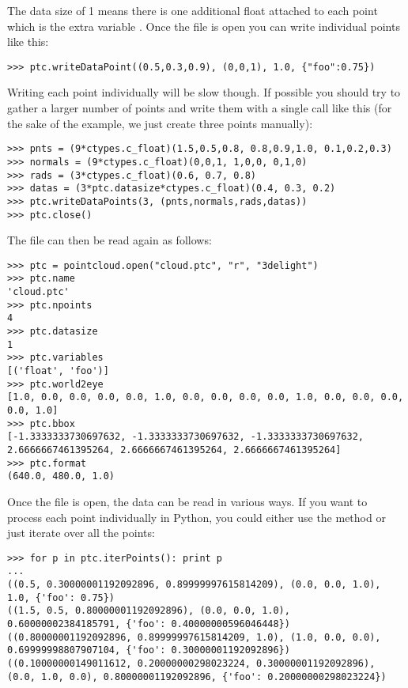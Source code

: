 The data size of 1 means there is one additional float attached to each point
which is the extra variable . Once the file is open you can write
individual points like this:

\begin{verbatim}
>>> ptc.writeDataPoint((0.5,0.3,0.9), (0,0,1), 1.0, {"foo":0.75})
\end{verbatim}

Writing each point individually will be slow though. If possible you should try
to gather a larger number of points and write them with a single call like this
(for the sake of the example, we just create three points manually):

\begin{verbatim}
>>> pnts = (9*ctypes.c_float)(1.5,0.5,0.8, 0.8,0.9,1.0, 0.1,0.2,0.3)
>>> normals = (9*ctypes.c_float)(0,0,1, 1,0,0, 0,1,0)
>>> rads = (3*ctypes.c_float)(0.6, 0.7, 0.8)
>>> datas = (3*ptc.datasize*ctypes.c_float)(0.4, 0.3, 0.2)
>>> ptc.writeDataPoints(3, (pnts,normals,rads,datas))
>>> ptc.close()
\end{verbatim}

The file can then be read again as follows:

\begin{verbatim}
>>> ptc = pointcloud.open("cloud.ptc", "r", "3delight")
>>> ptc.name
'cloud.ptc'
>>> ptc.npoints
4
>>> ptc.datasize
1
>>> ptc.variables
[('float', 'foo')]
>>> ptc.world2eye
[1.0, 0.0, 0.0, 0.0, 0.0, 1.0, 0.0, 0.0, 0.0, 0.0, 1.0, 0.0, 0.0, 0.0, 0.0, 1.0]
>>> ptc.bbox
[-1.3333333730697632, -1.3333333730697632, -1.3333333730697632, 2.6666667461395264, 2.6666667461395264, 2.6666667461395264]
>>> ptc.format
(640.0, 480.0, 1.0)
\end{verbatim}

Once the file is open, the data can be read in various ways. If you want
to process each point individually in Python, you could either use the
 method or just iterate over all the points:

\begin{verbatim}
>>> for p in ptc.iterPoints(): print p
... 
((0.5, 0.30000001192092896, 0.89999997615814209), (0.0, 0.0, 1.0), 1.0, {'foo': 0.75})
((1.5, 0.5, 0.80000001192092896), (0.0, 0.0, 1.0), 0.60000002384185791, {'foo': 0.40000000596046448})
((0.80000001192092896, 0.89999997615814209, 1.0), (1.0, 0.0, 0.0), 0.69999998807907104, {'foo': 0.30000001192092896})
((0.10000000149011612, 0.20000000298023224, 0.30000001192092896), (0.0, 1.0, 0.0), 0.80000001192092896, {'foo': 0.20000000298023224})
\end{verbatim}

